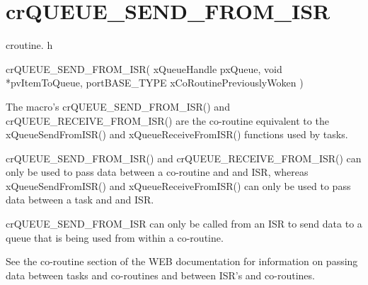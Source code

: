 \hypertarget{group__cr_q_u_e_u_e___s_e_n_d___f_r_o_m___i_s_r}{\section{cr\-Q\-U\-E\-U\-E\-\_\-\-S\-E\-N\-D\-\_\-\-F\-R\-O\-M\-\_\-\-I\-S\-R}
\label{group__cr_q_u_e_u_e___s_e_n_d___f_r_o_m___i_s_r}
}
croutine. h 
\begin{DoxyPre}
  crQUEUE\_SEND\_FROM\_ISR(
                            xQueueHandle pxQueue,
                            void *pvItemToQueue,
                            portBASE\_TYPE xCoRoutinePreviouslyWoken
                       )\end{DoxyPre}


The macro's cr\-Q\-U\-E\-U\-E\-\_\-\-S\-E\-N\-D\-\_\-\-F\-R\-O\-M\-\_\-\-I\-S\-R() and cr\-Q\-U\-E\-U\-E\-\_\-\-R\-E\-C\-E\-I\-V\-E\-\_\-\-F\-R\-O\-M\-\_\-\-I\-S\-R() are the co-\/routine equivalent to the x\-Queue\-Send\-From\-I\-S\-R() and x\-Queue\-Receive\-From\-I\-S\-R() functions used by tasks.

cr\-Q\-U\-E\-U\-E\-\_\-\-S\-E\-N\-D\-\_\-\-F\-R\-O\-M\-\_\-\-I\-S\-R() and cr\-Q\-U\-E\-U\-E\-\_\-\-R\-E\-C\-E\-I\-V\-E\-\_\-\-F\-R\-O\-M\-\_\-\-I\-S\-R() can only be used to pass data between a co-\/routine and and I\-S\-R, whereas x\-Queue\-Send\-From\-I\-S\-R() and x\-Queue\-Receive\-From\-I\-S\-R() can only be used to pass data between a task and and I\-S\-R.

cr\-Q\-U\-E\-U\-E\-\_\-\-S\-E\-N\-D\-\_\-\-F\-R\-O\-M\-\_\-\-I\-S\-R can only be called from an I\-S\-R to send data to a queue that is being used from within a co-\/routine.

See the co-\/routine section of the W\-E\-B documentation for information on passing data between tasks and co-\/routines and between I\-S\-R's and co-\/routines.


